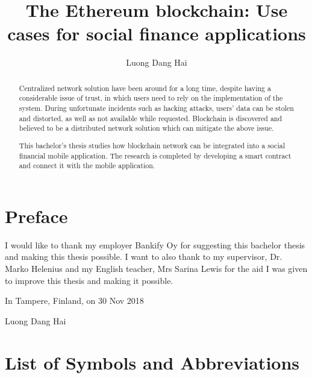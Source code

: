 \documentclass[twoside,draftfooter]{tutthesis} %
\author{Luong Dang Hai}
\title{The Ethereum blockchain: Use cases for social finance applications}
\begin{document}
\maketitle



\begin{abstract}

Centralized network solution have been around for a long time, despite having a considerable issue of trust, in which users need to rely on the implementation of the system. During unfortunate incidents such as hacking attacks, users' data can be stolen and distorted, as well as not available while requested. Blockchain is discovered and believed to be a distributed network solution which can mitigate the above issue.

This bachelor's thesis studies how blockchain network can be integrated into a social financial mobile application. The research is completed by developing a smart contract and connect it with the mobile application.

 
\end{abstract}


\chapter*{Preface}

I would like to thank my employer Bankify Oy for suggesting this bachelor thesis and making this thesis possible. I want to also thank to my supervisor, Dr. Marko Helenius and my English teacher, Mrs Sarina Lewis for the aid I was given to improve this thesis and making it possible.

\vspace{2\baselineskip}

In Tampere, Finland, on 30 Nov 2018

\vspace{2\baselineskip}

Luong Dang Hai



\tableofcontents

\listoffigures



\chapter*{List of Symbols and Abbreviations}
\end{document}

